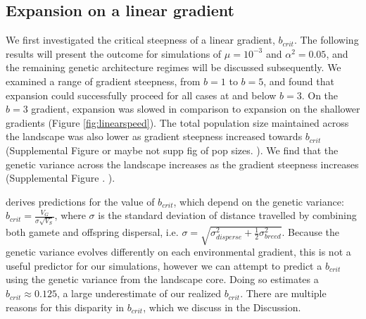 \subsection{Expansion on a linear gradient}

We first investigated the critical steepness of a linear gradient, $b_{crit}$. The following results will present the outcome for simulations of $\mu = 10^{-3}$ and $\alpha^2 = 0.05$, and the remaining genetic architecture regimes will be discussed subsequently. We examined a range of gradient steepness, from $b = 1$ to $b = 5$, and found that expansion could successfully proceed for all cases at and below $b = 3$. On the $b = 3$ gradient, expansion was slowed in comparison to expansion on the shallower gradients (Figure \ref{fig:linearspeed}). The total population size maintained across the landscape was also lower as gradient steepness increased towards $b_{crit}$ (Supplemental Figure or maybe not supp fig of pop sizes. ). We find that the genetic variance across the landscape increases as the gradient steepness increases (Supplemental Figure . ).  %

\citet{Barton:2001} derives predictions for the value of $b_{crit}$, which depend on the genetic variance: $b_{crit} = \frac{V_G}{\sigma \sqrt{V_S}}$, where $\sigma$ is the standard deviation of distance travelled by combining both gamete and offspring dispersal, i.e. $\sigma = \sqrt{\sigma_{disperse}^2 + \frac{1}{2}\sigma_{breed}^2}$. Because the genetic variance evolves differently on each environmental gradient, this is not a useful predictor for our simulations, however we can attempt to predict a $b_{crit}$ using the genetic variance from the landscape core. Doing so estimates a $b_{crit} \approx 0.125$, a large underestimate of our realized $b_{crit}$. There are multiple reasons for this disparity in $b_{crit}$, which we discuss in the Discussion.






